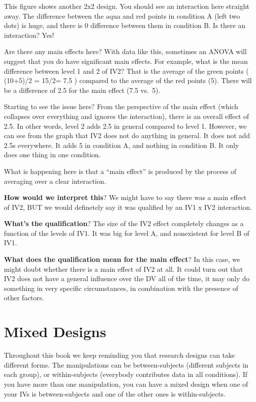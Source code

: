 \documentclass[
]{book}
\begin{document}
This figure shows another 2x2 design. You should see an interaction here straight away. The difference between the aqua and red points in condition A (left two dots) is huge, and there is 0 difference between them in condition B. Is there an interaction? Yes!

Are there any main effects here? With data like this, sometimes an ANOVA will suggest that you do have significant main effects. For example, what is the mean difference between level 1 and 2 of IV2? That is the average of the green points ( (10+5)/2 = 15/2= 7.5 ) compared to the average of the red points (5). There will be a difference of 2.5 for the main effect (7.5 vs.~5).

Starting to see the issue here? From the perspective of the main effect (which collapses over everything and ignores the interaction), there is an overall effect of 2.5. In other words, level 2 adds 2.5 in general compared to level 1. However, we can see from the graph that IV2 does not do anything in general. It does not add 2.5s everywhere. It adds 5 in condition A, and nothing in condition B. It only does one thing in one condition.

What is happening here is that a ``main effect'' is produced by the process of averaging over a clear interaction.

\textbf{How would we interpret this}? We might have to say there was a main effect of IV2, BUT we would definetely say it was qualified by an IV1 x IV2 interaction.

\textbf{What's the qualification}? The size of the IV2 effect completely changes as a function of the levels of IV1. It was big for level A, and nonexistent for level B of IV1.

\textbf{What does the qualification mean for the main effect}? In this case, we might doubt whether there is a main effect of IV2 at all. It could turn out that IV2 does not have a general influence over the DV all of the time, it may only do something in very specific circumstances, in combination with the presence of other factors.

\section{Mixed Designs}\label{mixed-designs}

Throughout this book we keep reminding you that research designs can take different forms. The manipulations can be between-subjects (different subjects in each group), or within-subjects (everybody contributes data in all conditions). If you have more than one manipulation, you can have a mixed design when one of your IVs is between-subjects and one of the other ones is within-subjects.
\end{document}
